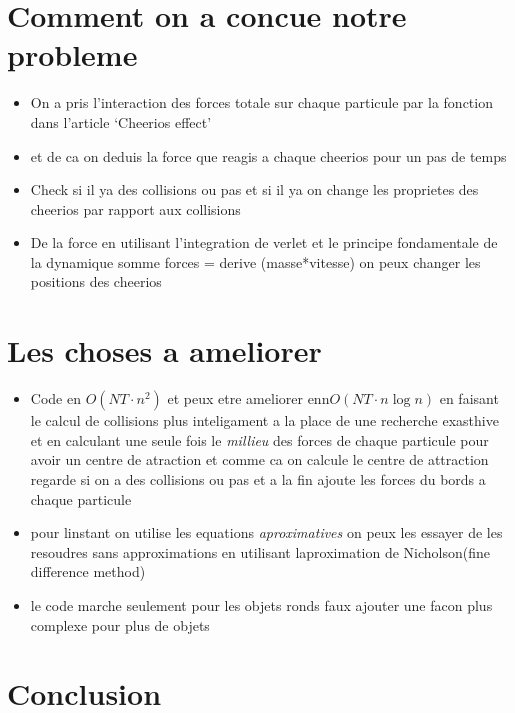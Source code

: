 \documentclass[a4paper, 11pt, oneside]{article} %
\begin{document}


\section{Comment on a concue notre probleme}
    \begin{itemize}
        \item On a pris l'interaction des forces totale sur chaque particule par la fonction dans l'article `Cheerios effect'
        \item et de ca on deduis la force que reagis a chaque cheerios pour un pas de temps 
        \item Check si il ya des collisions ou pas et si il ya on change les proprietes des cheerios par rapport aux collisions
        \item De la force en utilisant l'integration de verlet et le principe fondamentale de la dynamique somme forces = derive (masse*vitesse) on peux changer les positions des cheerios
    \end{itemize}

\section{Les choses a ameliorer}
    \begin{itemize}
        \item Code en $O(NT\cdot n^2)$ et peux etre ameliorer enn$O(NT\cdot n\log n)$ en faisant le calcul de collisions plus inteligament a la place de une recherche exasthive et en calculant une seule fois le \textit{millieu} des forces de chaque particule pour avoir un centre de atraction et comme ca on calcule le centre de attraction regarde si on a des collisions ou pas et a la fin ajoute les forces du bords a chaque particule
        \item pour linstant on utilise les equations \textit{aproximatives} on peux les essayer de les resoudres sans approximations en utilisant laproximation de Nicholson(fine difference method)
        \item le code marche seulement pour les objets ronds faux ajouter une facon plus complexe pour plus de objets
    \end{itemize}
\section*{Conclusion}

\newpage
\thispagestyle{empty}
\nocite{*}
\printbibliography[title = Bibliographie]
\end{document}
